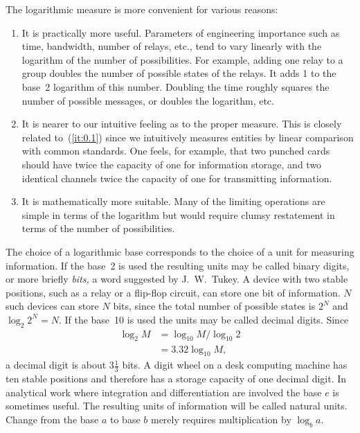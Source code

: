 The logarithmic measure is more convenient for various reasons:
\begin{enumerate}
\item
\label{it:0.1}
It is practically more useful.  Parameters of engineering importance such as
time, bandwidth, number of relays, etc., tend to vary linearly with the
logarithm of the number of possibilities.  For example, adding one relay to
a group doubles the number of possible states of the relays.  It adds 1 to
the base~2 logarithm of this number.  Doubling the time roughly squares the
number of possible messages, or doubles the logarithm, etc.
\item
It is nearer to our intuitive feeling as to the proper measure.  This is
closely related to~(\ref{it:0.1}) since we intuitively measures entities by
linear comparison with common standards.  One feels, for example, that two
punched cards should have twice the capacity of one for information
storage, and two identical channels twice the capacity of one for
transmitting information.
\item
It is mathematically more suitable.  Many of the limiting operations are
simple in terms of the logarithm but would require clumsy restatement in
terms of the number of possibilities.
\end{enumerate}

The choice of a logarithmic base corresponds to the choice of a unit for
measuring information.  If the base~2 is used the resulting units may be
called binary digits, or more briefly \emph{bits,} a word suggested by
J.~W.~Tukey.  A device with two stable positions, such as a relay or a
flip-flop circuit, can store one bit of information.  $N$ such devices can
store $N$ bits, since the total number of possible states is $2^N$ and
$\log_2 2^N=N$.  If the base~10 is used the units may be called decimal
digits.  Since
\begin{align*}
\log_2 M&=\log_{10}M/\log_{10}2\\
	&=3.32\log_{10}M,
\end{align*}
a decimal digit is about $3\frac13$ bits.  A digit wheel on a desk
computing machine has ten stable positions and therefore has a storage
capacity of one decimal digit.  In analytical work where integration and
differentiation are involved the base $e$ is sometimes useful.  The
resulting units of information will be called natural units.  Change from
the base $a$ to base $b$ merely requires multiplication by $\log_b a$.

